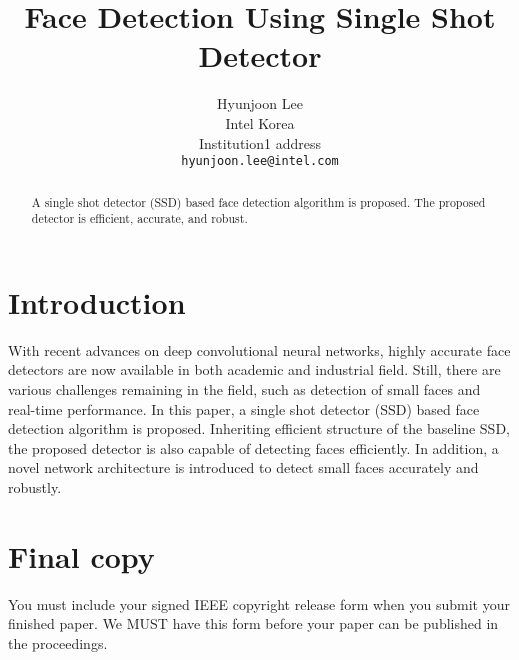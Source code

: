 \documentclass[10pt,twocolumn,letterpaper]{article}
\begin{document}
\title{Face Detection Using Single Shot Detector}

\author{Hyunjoon Lee\\
Intel Korea\\
Institution1 address\\
{\tt\small hyunjoon.lee@intel.com}
}

\maketitle

\begin{abstract}
	A single shot detector (SSD) based face detection algorithm is proposed.
	The proposed detector is efficient, accurate, and robust. 
\end{abstract}

\section{Introduction}

With recent advances on deep convolutional neural networks, 
highly accurate face detectors are now available in both academic and industrial field.
Still, there are various challenges remaining in the field, 
such as detection of small faces and real-time performance.
In this paper, a single shot detector (SSD) based face detection algorithm is proposed.
Inheriting efficient structure of the baseline SSD, 
the proposed detector is also capable of detecting faces efficiently.
In addition, a novel network architecture is introduced to detect small faces accurately and robustly.


\section{Final copy}

You must include your signed IEEE copyright release form when you submit
your finished paper. We MUST have this form before your paper can be
published in the proceedings.


{\small


}
\end{document}
